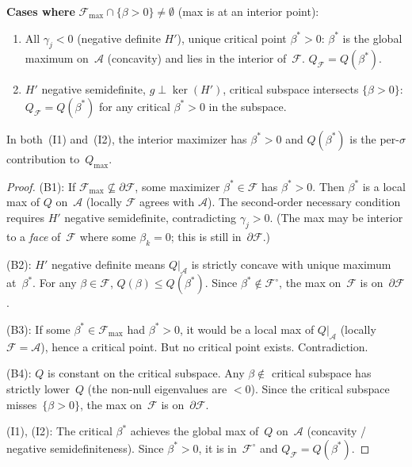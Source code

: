 \begin{proposition}
\medskip\noindent
\textbf{Cases where}
$\mathcal{F}_{\max} \cap \{\beta > 0\} \neq \emptyset$
(max is at an interior point):
\begin{enumerate}
  \item[(I1)] All $\gamma_j < 0$ (negative definite $H'$),
    unique critical point $\beta^* > 0$:
    $\beta^*$ is the global maximum on~$\mathcal{A}$
    (concavity) and lies in the interior of~$\mathcal{F}$.
    $Q_{\mathcal{F}} = Q(\beta^*)$.

  \item[(I2)] $H'$ negative semidefinite, $g \perp \ker(H')$,
    critical subspace intersects $\{\beta > 0\}$:
    $Q_{\mathcal{F}} = Q(\beta^*)$ for any critical
    $\beta^* > 0$ in the subspace.
\end{enumerate}

In both~(I1) and~(I2), the interior maximizer has $\beta^* > 0$
and $Q(\beta^*)$ is the per-$\sigma$ contribution to~$Q_{\max}$.
\end{proposition}

\begin{proof}
(B1): If $\mathcal{F}_{\max} \not\subseteq \partial\mathcal{F}$,
some maximizer $\beta^* \in \mathcal{F}$ has $\beta^* > 0$.
Then $\beta^*$ is a local max of $Q$ on~$\mathcal{A}$
(locally $\mathcal{F}$ agrees with $\mathcal{A}$).
The second-order necessary condition requires $H'$ negative
semidefinite, contradicting $\gamma_j > 0$.
(The max may be interior to a \emph{face} of~$\mathcal{F}$
where some $\beta_k = 0$; this is still in~$\partial\mathcal{F}$.)

(B2): $H'$ negative definite means $Q|_{\mathcal{A}}$ is strictly
concave with unique maximum at~$\beta^*$.
For any $\beta \in \mathcal{F}$, $Q(\beta) \leq Q(\beta^*)$.
Since $\beta^* \notin \mathcal{F}^{\circ}$,
the max on~$\mathcal{F}$ is on~$\partial\mathcal{F}$.

(B3): If some $\beta^* \in \mathcal{F}_{\max}$ had $\beta^* > 0$,
it would be a local max of $Q|_{\mathcal{A}}$ (locally $\mathcal{F} = \mathcal{A}$),
hence a critical point. But no critical point exists. Contradiction.

(B4): $Q$ is constant on the critical subspace.
Any $\beta \notin$ critical subspace has strictly lower~$Q$
(the non-null eigenvalues are $< 0$).
Since the critical subspace misses~$\{\beta > 0\}$,
the max on~$\mathcal{F}$ is on~$\partial\mathcal{F}$.

(I1), (I2): The critical $\beta^*$ achieves the global max of~$Q$
on~$\mathcal{A}$ (concavity / negative semidefiniteness).
Since $\beta^* > 0$, it is in~$\mathcal{F}^{\circ}$ and
$Q_{\mathcal{F}} = Q(\beta^*)$.
\end{proof}


